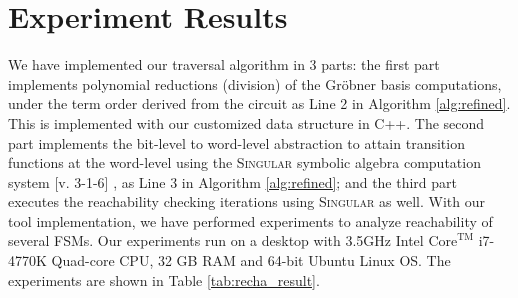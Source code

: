 \begin{Example}
\begin{figure}[H]
\end{figure}

\end{Example}

\section{Experiment Results}
\label{sec:exp_reacha}
We have implemented our traversal algorithm in 3 parts:
the first part implements polynomial reductions (division) of the
Gr\"obner basis computations, under the term order derived from the
circuit as Line 2 in Algorithm \ref{alg:refined}. This is implemented 
with our customized data structure in
C++. The second part implements the bit-level to word-level
abstraction to attain transition functions at the word-level 
using the \textsc{Singular} symbolic
algebra computation system [v. 3-1-6] \cite{DGPS}, as Line 3 in 
Algorithm \ref{alg:refined}; and the third part
executes the reachability checking iterations using 
\textsc{Singular} as well. With our
tool implementation, we have performed experiments to analyze reachability
of several FSMs. Our experiments run on a desktop with
3.5GHz Intel $\text{Core}^\text{TM}$ i7-4770K Quad-core CPU, 32 GB RAM and
64-bit Ubuntu Linux OS. The experiments are shown in Table \ref{tab:recha_result}. 


